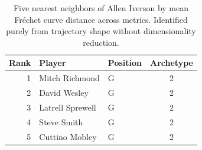 \begin{table}[htbp]
  \centering\small
  \begin{tabular}{rllc}
    \toprule
    Rank & Player & Position & Archetype \\
    \midrule
    1 & Mitch Richmond & G & 2 \\
    2 & David Wesley & G & 2 \\
    3 & Latrell Sprewell & G & 2 \\
    4 & Steve Smith & G & 2 \\
    5 & Cuttino Mobley & G & 2 \\
    \bottomrule
  \end{tabular}
  \caption{Five nearest neighbors of Allen Iverson by mean Fr\'{e}chet curve distance across metrics. Identified purely from trajectory shape without dimensionality reduction.}
  \label{tab:Allen_Iverson_frechet_curve_neighbors}
\end{table}

